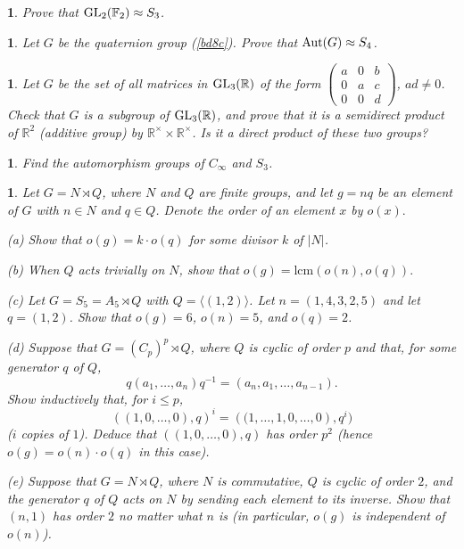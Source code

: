 \documentclass[a4paper,11pt,final,openany]{memoir}%
\newtheorem{exercise}[Y]{}
\theoremstyle{nonumberplain}
\begin{document}
\begin{exercise}
\label{x16} Prove that $\operatorname{GL}_{2}(\mathbb{F}_{2}\mathbb{)}\approx S_{3}$.
\end{exercise}

\begin{exercise}
\label{x17} Let $G$ be the quaternion group (\ref{bd8c}). Prove that
$\operatorname{Aut}(G)\approx S_{4}$.

\end{exercise}

\begin{exercise}
\label{x18} Let $G$ be the set of all matrices in $\operatorname{GL}_{3}(\mathbb{R})$ of the
form $\left(
\begin{smallmatrix}
a & 0 & b\\
0 & a & c\\
0 & 0 & d
\end{smallmatrix}
\right)  $, $ad\neq0$. Check that $G$ is a subgroup of $\operatorname{GL}_{3}(\mathbb{R})$,
and prove that it is a semidirect product of $\mathbb{R}^{2}$ (additive group)
by $\mathbb{R}^{\times}\times\mathbb{R}^{\times}$. Is it a direct product of
these two groups?


\end{exercise}

\begin{exercise}
\label{x19} Find the automorphism groups of $C_{\infty}$ and $S_{3}$.

\end{exercise}

\begin{exercise}
\label{x19a}Let $G=N\rtimes Q$, where $N$ and $Q$ are finite groups, and let
$g=nq$ be an element of $G$ with $n\in N$ and $q\in Q$. Denote the order of an
element $x$ by $o(x).$

(a) Show that $o(g)=k\cdot o(q)$ for some divisor $k$ of $|N|$.

(b) When $Q$ acts trivially on $N$, show that $o(g)=\mathrm{lcm}(o(n),o(q)).$

(c) Let $G=S_{5}=A_{5}\rtimes Q$ with $Q=\langle(1,2)\rangle$. Let
$n=(1,4,3,2,5)$ and let $q=(1,2)$. Show that $o(g)=6$, $o(n)=5$, and $o(q)=2$.

(d) Suppose that $G=(C_{p})^{p}\rtimes Q$, where $Q$ is cyclic of order $p$
and that, for some generator $q$ of $Q$,%
\[
q(a_{1},\ldots,a_{n})q^{-1}=(a_{n},a_{1},\ldots,a_{n-1}).
\]
Show inductively that, for $i\leq p$,%
\[
\left(  (1,0,\ldots,0),q\right)  ^{i}=\left(  (1,\ldots,1,0,\ldots,0\right)
,q^{i})
\]
($i$ copies of $1$). Deduce that $\left(  (1,0,\ldots,0),q\right)  $ has order
$p^{2}$ (hence $o(g)=o(n)\cdot o(q)$ in this case).

(e) Suppose that $G=N\rtimes Q$, where $N$ is commutative, $Q$ is cyclic of
order $2$, and the generator $q$ of $Q$ acts on $N$ by sending each element to
its inverse. Show that $(n,1)$ has order $2$ no matter what $n$ is (in
particular, $o(g)$ is independent of $o(n)$).

\end{exercise}
\end{document}
